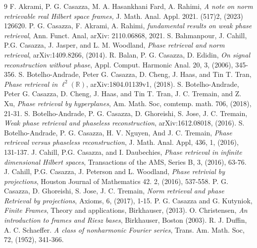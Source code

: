 \begin{thebibliography}{9}
F. Akrami, P. G. Casazza, M. A. Hasankhani Fard, A. Rahimi, \textit{A note on norm retrievable real Hilbert space  frames,} J. Math. Anal. Appl.  2021. (517)2, (2023) 126620.
 P. G. Casazza, F. Akrami, A. Rahimi,  \textit{fundamental results on weak phase retrieval}, 	Ann. Funct. Anal, arXiv:	2110.06868, 2021.
 S. Bahmanpour, J. Cahill, P.G. Casazza, J. Jasper, and L. M. Woodland, \textit{Phase retrieval and norm retrieval}, arXiv:1409.8266, (2014).
R. Balan, P. G. Casazza, D. Edidin, \textit{On signal reconstruction without  phase}, Appl. Comput. Harmonic Anal. 20, 3, (2006), 345-356.
 S. Botelho-Andrade, Peter G. Casazza, D. Cheng, J. Haas, and Tin T. Tran, \textit{Phase retrieval in $\ell^2(\mathbb {R})$},
  arXiv:1804.01139v1,  (2018).
 S. Botelho-Andrade, Peter G. Casazza, D. Cheng, J. Haas, and Tin T. Tran, J. C. Tremain, and Z. Xu, \textit{Phase retrieval by hyperplanes}, 	Am. Math. Soc, comtemp. math. 706, (2018), 21-31.
 S. Botelho-Andrade, P. G. Casazza, D. Ghoreishi, S. Jose,  J. C. Tremain, \textit{Weak phase retrieval and phaseless  reconstruction}, 	 arXiv:1612.08018, (2016).
S. Botelho-Andrade, P. G. Casazza, H. V. Nguyen, And J.  C. Tremain, \textit{Phase retrieval versus phaseless reconstruction},  J. Math. Anal. Appl,  436,  1,  (2016), 131-137.
J. Cahill, P.G. Casazza, and I. Daubechies, \textit{Phase retrieval in infinite dimensional
Hilbert spaces}, Transactions of the AMS, Series B, 3, (2016), 63-76.
J. Cahill, P.G. Casazza, J. Peterson and L. Woodland, \textit{Phase retrivial by projections},
 Houston Journal of Mathematics   42. 2, (2016), 537-558.
 P. G. Casazza, D. Ghoreishi, S. Jose, J. C. Tremain,\textit{ Norm retrieval and phase Retrieval by projections}, Axioms, 6, (2017), 1-15.
  P. G. Casazza and G. Kutyniok, \textit{Finite Frames}, Theory and applications, Birkhauser, (2013).
 O. Christensen,\textit{ An introduction to frames and Riesz bases}, Birkhauser, Boston (2003).
 R. J. Duffin, A. C. Schaeffer. \textit{A class of nonharmonic Fourier series}, Trans. Am. Math. Soc, 72, (1952), 341-366.
\end{thebibliography}
 